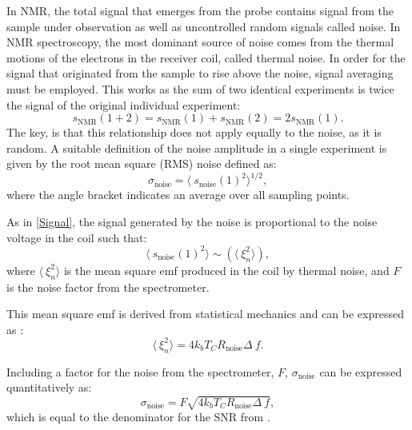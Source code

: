 In NMR, the total signal that emerges from the probe contains signal from the sample
under observation as well as uncontrolled random signals called noise. In NMR spectroscopy, the most dominant source of noise comes
from the thermal motions of the electrons
in the receiver coil, called thermal noise. In order for the signal that originated from the sample to rise above the noise,
signal averaging must be employed. This works as the sum of two identical experiments is twice the signal
of the original individual experiment:
\begin{equation}
  s_\text{NMR}(1+2) = s_\text{NMR}(1) + s_\text{NMR}(2) = 2s_\text{NMR}(1).
\end{equation}
The key, is that this relationship does not apply equally to the noise, as it is random. A suitable
definition of the noise amplitude in a single experiment is given by the root mean square (RMS) noise defined
as:
\begin{equation}
  \sigma_\text{noise} = \langle~s_{\text{noise}}(1)^2\rangle^{1/2},
\end{equation}
where the angle bracket indicates an average over all sampling points.

As in \ref{Signal}, the signal generated by the noise is proportional to the noise
voltage in the coil such that:
\begin{equation}
  \langle~s_{\text{noise}}(1)^2\rangle \sim (\langle~\xi_n^2\rangle),
\end{equation}
where $\langle~\xi_n^2\rangle$ is the mean square emf produced in the coil by thermal noise, and $F$ is the noise
factor from the spectrometer.

This mean square emf is derived from statistical mechanics and can be expressed as \citep{nyquist1928thermal, johnson1928thermal}:
\begin{equation}
  \langle~\xi_n^2\rangle = 4k_bT_CR_{\text{noise}}\Delta~f.
\end{equation}

Including a factor for the noise from the spectrometer, $F$, $\sigma_\text{noise}$ can be expressed
quantitatively as:
\begin{equation}
  \sigma_\text{noise} = F\sqrt{4k_bT_CR_{\text{noise}}\Delta~f},
\end{equation}
which is equal to the denominator for the SNR from .


